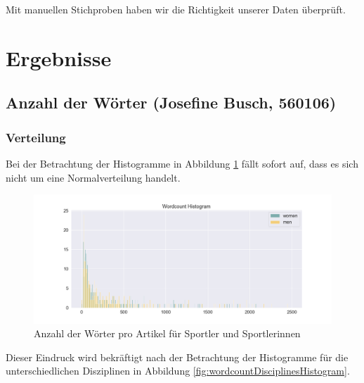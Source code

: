 \documentclass[11pt]{article}
\begin{document}
Mit manuellen Stichproben haben wir die Richtigkeit unserer Daten überprüft.

\section{Ergebnisse}
\subsection{Anzahl der Wörter (Josefine Busch, 560106)}
\subsubsection{Verteilung}
Bei der Betrachtung der Histogramme in Abbildung \ref{fig:wordcountHistogram} fällt sofort auf, dass es sich nicht um eine Normalverteilung handelt.

\begin{figure}
\includegraphics[width=1\textwidth]{figures/wordcount_small_bins_histogram.png}
\caption[Anzahl der Wörter pro Artikel für Sportler und Sportlerinnen]{Anzahl der Wörter pro Artikel für Sportler und Sportlerinnen}
\label{fig:wordcountHistogram}
\end{figure}

Dieser Eindruck wird bekräftigt nach der Betrachtung der Histogramme für die unterschiedlichen Disziplinen in Abbildung \ref{fig:wordcountDisciplinesHistogram}.
\end{document}
